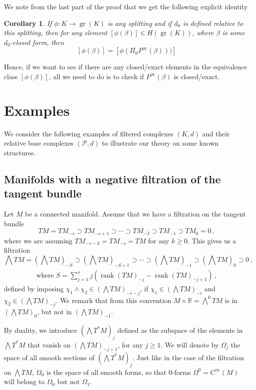 \documentclass[10pt]{amsart}
\newcounter{dummy} \numberwithin{dummy}{section}
\newtheorem{corollary}[dummy]{Corollary}
\theoremstyle{remark}
\DeclareMathOperator{\rank}{rank}
\DeclareMathOperator{\gr}{gr}
\numberwithin{equation}{section}
\begin{document}
We note from the last part of the proof that we get the following explicit identity
\begin{corollary}
If $\phi:K \to \gr(K)$ is any splitting and if $d_0$ is defined relative to this splitting, then for any element $[\phi(\beta)]\in H(\gr(K))$, where $\beta$ is some $d_0$-closed form, then
$$[\phi(\beta)] = [\phi(\Pi_0 P^\infty(\beta)))]$$
\end{corollary}
Hence, if we want to see if there are any closed/exact elements in the equivalence class $[\phi(\beta)]$, all we need to do is to check if $P^\infty(\beta)$ is closed/exact.

\section{Examples} \label{sec:Examples}
We consider the following examples of filtered complexes $(K,d)$ and their relative base complexes $(\mathcal{P},d)$ to illustrate our theory on some known structures.

\subsection{Manifolds with a negative filtration of the tangent bundle}\label{subsection 3.1}
Let $M$ be a connected manifold. Assume that we have a filtration on the tangent bundle
$$TM = TM_{-s} \supset TM_{-s+1} \supset \cdots \supset TM_{-2} \supset TM_{-1}\supset TM_0 =0\,,$$
where we are assuming $TM_{-s-k}=TM_{-s}=TM$ for any $k\ge 0$.
This gives us a filtration
$$\bigwedge TM  = (\bigwedge TM)_{-S} \supset (\bigwedge TM)_{-S+1} \supset \cdots \supset (\bigwedge TM)_{-1} \supset (\bigwedge TM)_{0}\supset 0\ ,$$
\begin{align}\label{def homogeneous dimension}
    \text{where }S = \sum_{j=1}^s j \left(\rank (TM)_{-j} - \rank (TM)_{-j+1}\right)\,,
\end{align}
defined by imposing $\chi_1 \wedge \chi_2\in  (\bigwedge TM)_{-i-j}$, if $\chi_1 \in (\bigwedge TM)_{-i}$ and $\chi_2 \in (\bigwedge TM)_{-j}$. We remark that from this convention $M \times \mathbb{R} = \bigwedge^0 TM$ is in $(\bigwedge TM)_{0}$, but not in $(\bigwedge TM)_{-1}$. 

By duality, we introduce $(\bigwedge T^\ast M)_{j}$ defined as the subspace of the elements in $\bigwedge T^*M$ that vanish on $(\bigwedge TM)_{-j+1}$, for any $j\ge 1$. We will denote by $\Omega_j$ the space of all smooth sections of $(\bigwedge T^\ast M)_{j}$. Just like in the case of the filtration on $\bigwedge TM$, $\Omega_0$ is the space of all smooth forms, so that $0$-forms $\Omega^0=C^\infty(M)$ will belong to $\Omega_0$ but not $\Omega_1$.
\end{document}
